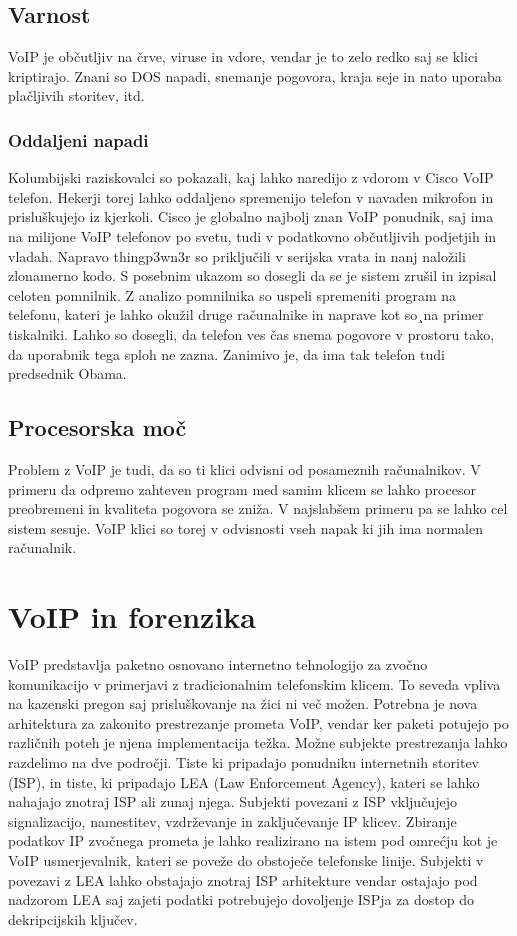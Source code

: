 \documentclass{acm_proc_article-sp}
\begin{document}
\subsection{Varnost}
VoIP je občutljiv na črve, viruse in vdore, vendar je to zelo redko saj se klici kriptirajo. Znani so DOS napadi, snemanje pogovora, kraja seje in nato uporaba plačljivih storitev, itd.

\subsubsection{Oddaljeni napadi}
Kolumbijski raziskovalci so pokazali, kaj lahko naredijo z vdorom v Cisco VoIP telefon. Hekerji torej lahko oddaljeno spremenijo telefon v navaden mikrofon in prisluškujejo iz kjerkoli. Cisco je globalno najbolj znan VoIP ponudnik, saj ima na milijone VoIP telefonov po svetu, tudi v podatkovno občutljivih podjetjih in vladah. Napravo thingp3wn3r so priključili v serijska vrata in nanj naložili zlonamerno kodo. S posebnim ukazom so dosegli da se je sistem zrušil in izpisal celoten pomnilnik. Z analizo pomnilnika so uspeli spremeniti program na telefonu, kateri je lahko okužil druge računalnike in naprave kot so¸na primer tiskalniki. Lahko so dosegli, da telefon ves čas snema pogovore v prostoru tako, da uporabnik tega sploh ne zazna. Zanimivo je, da ima tak telefon tudi predsednik Obama.


\subsection{Procesorska moč}
Problem z VoIP je tudi, da so ti klici odvisni od posameznih računalnikov. V primeru da odpremo zahteven program med samim klicem se lahko procesor preobremeni in kvaliteta pogovora se zniža. V najslabšem primeru pa se lahko cel sistem sesuje. VoIP klici so torej v odvisnosti vseh napak ki jih ima normalen računalnik.


\section{VoIP in forenzika}
VoIP predstavlja paketno osnovano internetno tehnologijo za zvočno komunikacijo v primerjavi z tradicionalnim telefonskim klicem. To seveda vpliva na kazenski pregon saj prisluškovanje na žici ni več možen. Potrebna je nova arhitektura za zakonito prestrezanje prometa VoIP, vendar ker paketi potujejo po različnih poteh je njena implementacija težka. Možne subjekte prestrezanja lahko razdelimo na dve področji. Tiste ki pripadajo ponudniku internetnih storitev (ISP), in tiste, ki pripadajo LEA (Law Enforcement Agency), kateri se lahko nahajajo znotraj ISP ali zunaj njega. Subjekti povezani z ISP vključujejo signalizacijo, namestitev, vzdrževanje in zaključevanje IP klicev. Zbiranje podatkov IP zvočnega prometa je lahko realizirano na istem pod omrećju kot je VoIP usmerjevalnik, kateri se poveže do obstoječe telefonske linije. Subjekti v povezavi z LEA lahko obstajajo znotraj ISP arhitekture vendar ostajajo pod nadzorom LEA saj zajeti podatki potrebujejo dovoljenje ISPja za dostop do dekripcijskih ključev.
\end{document}
